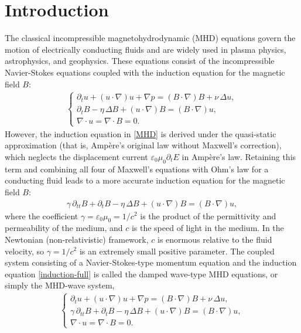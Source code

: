 \documentclass[reqno,11pt]{amsart}
\numberwithin{Thm}{section}
\begin{document}
\maketitle





\section{Introduction}

The classical incompressible magnetohydrodynamic (MHD) equations govern the motion of
electrically conducting fluids and are widely used in plasma physics, astrophysics, and
geophysics. These equations consist of the incompressible Navier-Stokes equations coupled
with the induction equation for the magnetic field $B$:
\begin{align}\label{MHD}
	\left\{
	\begin{array}{lll}
		\partial_t u + (u\cdot\nabla)u + \nabla p = (B\cdot\nabla)B + \nu\,\Delta u, \\[5pt]
		\partial_t B - \eta\,\Delta B + (u\cdot\nabla)B = (B\cdot\nabla)u, \\[5pt]
		\nabla\cdot u = \nabla\cdot B = 0.
	\end{array}
	\right.
\end{align}
However, the induction equation in \eqref{MHD} is derived under the quasi-static
approximation (that is, Amp\`{e}re's original law without Maxwell's correction), which
neglects the displacement current $\varepsilon_0\mu_0\partial_t E$ in Amp\`{e}re's law.
Retaining this term and combining all four of Maxwell's equations with Ohm's law for a
conducting fluid leads to a more accurate induction equation for the magnetic field $B$:
\begin{align}\label{induction-full}
	\gamma\,\partial_{tt} B + \partial_t B - \eta\,\Delta B
	+ (u\cdot\nabla)B = (B\cdot\nabla)u,
\end{align}
where the coefficient $\gamma = \varepsilon_0\mu_0 = 1/c^2$ is the product of the
permittivity and permeability of the medium, and $c$ is the speed of light in the medium.
In the Newtonian (non-relativistic) framework, $c$ is enormous relative to the fluid
velocity, so $\gamma = 1/c^2$ is an extremely small positive parameter. The coupled system consisting of a Navier-Stokes-type momentum equation and the induction equation
\eqref{induction-full} is called the damped wave-type MHD equations, or simply the
MHD-wave system,
\begin{align}\label{MHD-wave}
	\left\{
	\begin{array}{lll}
		\partial_t u + (u\cdot\nabla)u + \nabla p = (B\cdot\nabla)B + \nu\,\Delta u, \\[5pt]
		\gamma\,\partial_{tt} B + \partial_t B - \eta\,\Delta B + (u\cdot\nabla)B = (B\cdot\nabla)u, \\[5pt]
		\nabla\cdot u = \nabla\cdot B = 0.
	\end{array}
	\right.
\end{align}
\end{document}
